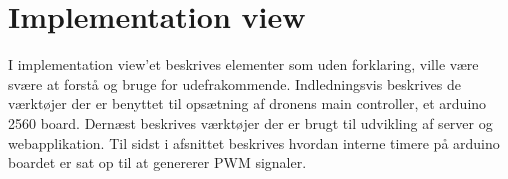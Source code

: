 \section{Implementation view}

I implementation view'et beskrives elementer som uden forklaring, ville være svære at forstå og bruge for udefrakommende. Indledningsvis beskrives de værktøjer der er benyttet til opsætning af dronens main controller, et arduino 2560 board. Dernæst beskrives værktøjer der er brugt til udvikling af server og webapplikation. Til sidst i afsnittet beskrives hvordan interne timere på arduino boardet er sat op til at genererer PWM signaler.  



\newpage


\newpage


\newpage

